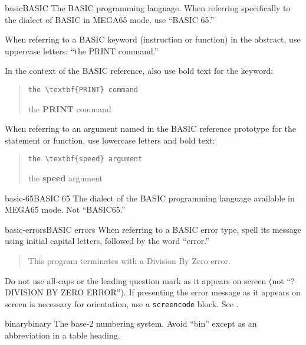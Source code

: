 \begin{sgentry}{basic}{BASIC}
    The BASIC programming language. When referring specifically to the dialect of BASIC in MEGA65 mode, use ``BASIC 65.''

    When referring to a BASIC keyword (instruction or function) in the abstract, use uppercase letters: ``the PRINT command.''

    In the context of the BASIC reference, also use bold text for the keyword:

    \begin{quote}
        \texttt{the {\textbackslash}textbf\{PRINT\} command}

        \hrulefill

        the \textbf{PRINT} command
    \end{quote}

    When referring to an argument named in the BASIC reference prototype for the statement or function, use lowercase letters and bold text:

    \begin{quote}
        \texttt{the {\textbackslash}textbf\{speed\} argument}

        \hrulefill

        the \textbf{speed} argument
    \end{quote}
\end{sgentry}

\begin{sgentry}{basic-65}{BASIC 65}
    The dialect of the BASIC programming language available in MEGA65 mode. Not ``BASIC65.''
\end{sgentry}

\begin{sgentry}{basic-errors}{BASIC errors}
    When referring to a BASIC error type, spell its message using initial capital letters, followed by the word ``error.''

    \begin{quote}
        This program terminates with a Division By Zero error.
    \end{quote}

    Do not use all-caps or the leading question mark as it appears on screen (not ``?DIVISION BY ZERO ERROR''). If presenting the error message as it appears on screen is necessary for orientation, use a \texttt{screencode} block. See .
\end{sgentry}

\begin{sgentry}{binary}{binary}
    The base-2 numbering system. Avoid ``bin'' except as an abbreviation in a table heading.
\end{sgentry}

